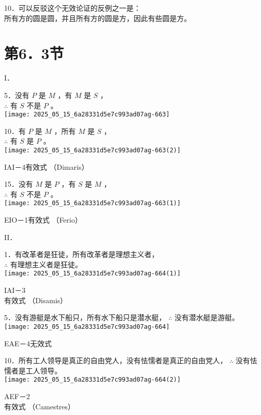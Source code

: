 10．可以反驳这个无效论证的反例之一是：\\
所有方的圆是圆，并且所有方的圆是方，因此有些圆是方。

\section*{第6．3节}
I．

5．没有 $P$ 是 $M$ ，有 $M$ 是 $S$ ，\\
$\therefore$ 有 $S$ 不是 $P$ 。\\
\texttt{[image: 2025\_05\_15\_6a28331d5e7c993ad07ag-663]}

10．有 $P$ 是 $M$ ，所有 $M$ 是 $S$ ，\\
$\therefore$ 有 $S$ 是 $P$ 。\\
\texttt{[image: 2025\_05\_15\_6a28331d5e7c993ad07ag-663(2)]}

IAI－4有效式 （Dimaris）

15．没有 $M$ 是 $P$ ，有 $S$ 是 $M$ ，\\
$\therefore$ 有 $S$ 不是 $P$ 。\\
\texttt{[image: 2025\_05\_15\_6a28331d5e7c993ad07ag-663(1)]}

EIO－1有效式 （Ferio）

II．

1．有改革者是狂徒，所有改革者是理想主义者，\\
$\therefore$ 有理想主义者是狂徒。\\
\texttt{[image: 2025\_05\_15\_6a28331d5e7c993ad07ag-664(1)]}

IAI－3\\
有效式 （Disamis）

5．没有游艇是水下船只，所有水下船只是潜水艇， $\therefore$ 没有潜水艇是游艇。\\
\texttt{[image: 2025\_05\_15\_6a28331d5e7c993ad07ag-664]}

EAE－4无效式

10．所有工人领导是真正的自由党人，没有怯懦者是真正的自由党人， $\therefore$ 没有怯懦者是工人领导。\\
\texttt{[image: 2025\_05\_15\_6a28331d5e7c993ad07ag-664(2)]}

AEF－2\\
有效式 （Camestres）

